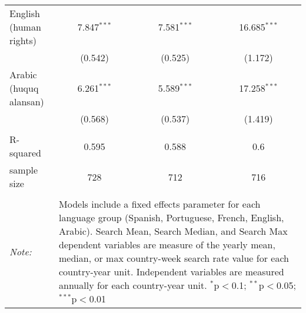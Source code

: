 \begin{table}[!htbp]
\begin{tabular}{@{\extracolsep{5pt}}lccc}
  English (human rights) & 7.847$^{***}$ & 7.581$^{***}$ & 16.685$^{***}$ \\ 
  & (0.542) & (0.525) & (1.172) \\ 
  Arabic (huquq alansan) & 6.261$^{***}$ & 5.589$^{***}$ & 17.258$^{***}$ \\ 
  & (0.568) & (0.537) & (1.419) \\ 
 \hline \\[-1.8ex] 
R-squared  & 0.595 & 0.588 & 0.6 \\ 
sample size  & 728 & 712 & 716 \\ 
\hline 
\hline \\[-1.8ex] 
\textit{Note:}  & \multicolumn{3}{l}{\parbox[t]{8cm}{Models include a fixed effects parameter for each language group (Spanish, Portuguese, French, English, Arabic). Search Mean, Search Median, and Search Max dependent variables are measure of the yearly mean, median, or max country-week search rate value for each country-year unit. Independent variables are measured annually for each country-year unit. $^{*}$p$<$0.1; $^{**}$p$<$0.05; $^{***}$p$<$0.01}} \\ 
\end{tabular} 
\end{table} 
